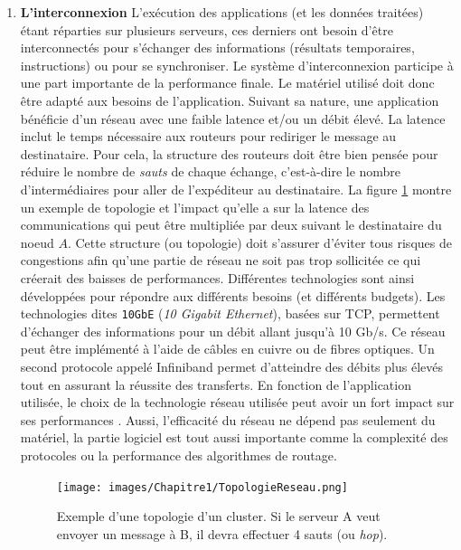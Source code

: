 \begin{enumerate}
            \item \textbf{L'interconnexion}\label{sec:edl_interco} L'exécution des applications (et les données traitées) étant réparties sur plusieurs serveurs, ces derniers ont besoin d'être interconnectés pour s'échanger des informations (résultats temporaires, instructions) ou pour se synchroniser. Le système d'interconnexion participe à une part importante de la performance finale. Le matériel utilisé doit donc être adapté aux besoins de l'application. Suivant sa nature, une application bénéficie d'un réseau avec une faible latence et/ou un débit élevé.
            La latence inclut le temps nécessaire aux routeurs pour rediriger le message au destinataire. Pour cela, la structure des routeurs doit être bien pensée pour réduire le nombre de \textit{sauts} de chaque échange, c'est-à-dire le nombre d'intermédiaires pour aller de l'expéditeur au destinataire. La figure \ref{pic_topologie} montre un exemple de topologie et l'impact qu'elle a sur la latence des communications qui peut être multipliée par deux suivant le destinataire du noeud $A$. Cette structure (ou topologie) doit s'assurer d'éviter tous risques de congestions afin qu'une partie de réseau ne soit pas trop sollicitée ce qui créerait des baisses de performances.    
            Différentes technologies sont ainsi développées pour répondre aux différents besoins (et différents budgets). Les technologies dites \verb|10GbE| (\textit{10 Gigabit Ethernet}), basées sur TCP, permettent d'échanger des informations pour un débit allant jusqu'à 10 Gb/s. Ce réseau peut être implémenté à l'aide de câbles en cuivre ou de fibres optiques. Un second protocole appelé Infiniband permet d'atteindre des débits plus élevés tout en assurant la réussite des transferts. En fonction de l'application utilisée, le choix de la technologie réseau utilisée peut avoir un fort impact sur ses performances \cite{Council2009}.
                Aussi, l'efficacité du réseau ne dépend pas seulement du matériel, la partie logiciel est tout aussi importante comme la complexité des protocoles ou la performance des algorithmes de routage.
                
                    \begin{figure}
                    \center
                    \texttt{[image: images/Chapitre1/TopologieReseau.png]}
                    \caption{\label{pic_topologie} Exemple d'une topologie d'un cluster. Si le serveur A veut envoyer un message à B, il devra effectuer 4 sauts (ou \textit{hop}).}
                    \end{figure}
          

\end{enumerate}
